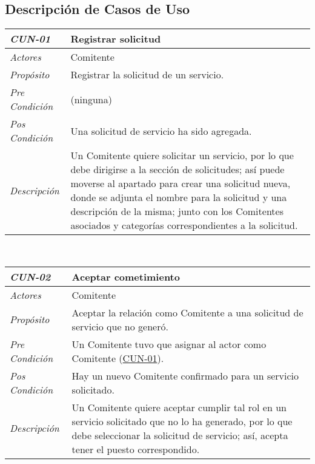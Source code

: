 \subsection[Uso de Negocio]
	{Descripci\'on de Casos de Uso}
\begin{center}
\hypertarget{CUN-01}{%
\begin{tabular}{ | p{3cm} | p{12.5cm} | }
	\hline
	\rowcolor{lightgray}
	\hfil \textbf{\textit{CUN-01}} &
	\hfil \textbf{Registrar solicitud} \\
	\hline
	\raggedleft \textit{Actores} & Comitente \\
	\hline
	\raggedleft \textit{Prop\'osito} & Registrar la
	solicitud de un servicio. \\
	\hline
	\raggedleft \textit{Pre Condici\'on} & (ninguna) \\
	\hline
	\raggedleft \textit{Pos Condici\'on} & Una solicitud
	de servicio ha sido agregada. \\
	\hline
	\raggedleft \textit{Descripci\'on} &
	Un Comitente quiere solicitar un servicio,
	por lo que debe dirigirse a la secci\'on de
	solicitudes; as\'i puede moverse al apartado
	para crear una solicitud nueva, donde se
	adjunta el nombre para la solicitud y una
	descripci\'on de la misma; junto con los
	Comitentes asociados y categor\'ias
	correspondientes a la solicitud. \\
	\hline
\end{tabular}} \\[1cm]
\hypertarget{CUN-02}{%
\begin{tabular}{ | p{3cm} | p{12.5cm} | }
	\hline
	\rowcolor{lightgray}
	\hfil \textbf{\textit{CUN-02}} &
	\hfil \textbf{Aceptar cometimiento} \\
	\hline
	\raggedleft \textit{Actores} & Comitente \\
	\hline
	\raggedleft \textit{Prop\'osito} & Aceptar la
	relaci\'on como Comitente a una solicitud de
	servicio que no gener\'o. \\
	\hline
	\raggedleft \textit{Pre Condici\'on} & Un Comitente
	tuvo que asignar al actor como Comitente
	(\hyperlink{CUN-01}{CUN-01}). \\
	\hline
	\raggedleft \textit{Pos Condici\'on} & Hay un nuevo
	Comitente confirmado para un servicio solicitado. \\
	\hline
	\raggedleft \textit{Descripci\'on} &
	Un Comitente quiere aceptar cumplir tal rol en un servicio
	solicitado que no lo ha generado, por lo que debe
	seleccionar la solicitud de servicio; as\'i, acepta tener
	el puesto correspondido. \\

\end{tabular}}
\end{center}
